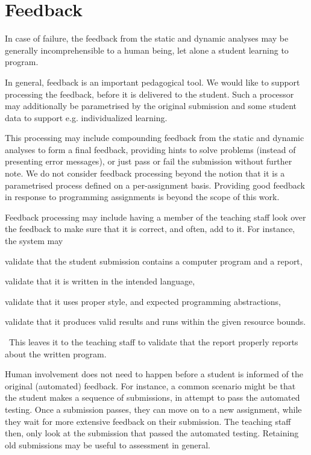 
\section{Feedback}

In case of failure, the feedback from the static and dynamic analyses may be
generally incomprehensible to a human being\cite{lerner-et-al-2007}, let alone
a student learning to program\cite{mccauley-et-al-2008}.

In general, feedback is an important pedagogical tool. We would like to support
processing the feedback, before it is delivered to the student. Such a
processor may additionally be parametrised by the original submission and some
student data to support e.g. individualized learning.

This processing may include compounding feedback from the static and dynamic
analyses to form a final feedback, providing hints to solve problems (instead
of presenting error messages), or just pass or fail the submission without
further note. We do not consider feedback processing beyond the notion that it
is a parametrised process defined on a per-assignment basis. Providing good
feedback in response to programming assignments is beyond the scope of this
work.

Feedback processing may include having a member of the teaching staff look over
the feedback to make sure that it is correct, and often, add to it. For
instance, the system may \begin{inparaenum}[(a)] \item validate that the
student submission contains a computer program and a report, \item validate
that it is written in the intended language, \item validate that it uses proper
style, and expected programming abstractions, \item validate that it produces
valid results and runs within the given resource bounds.\end{inparaenum}~This
leaves it to the teaching staff to validate that the report properly reports
about the written program.

Human involvement does not need to happen before a student is informed of the
original (automated) feedback. For instance, a common scenario might be that
the student makes a sequence of submissions, in attempt to pass the automated
testing. Once a submission passes, they can move on to a new assignment, while
they wait for more extensive feedback on their submission. The teaching staff
then, only look at the submission that passed the automated testing. Retaining
old submissions may be useful to assessment in general. 
